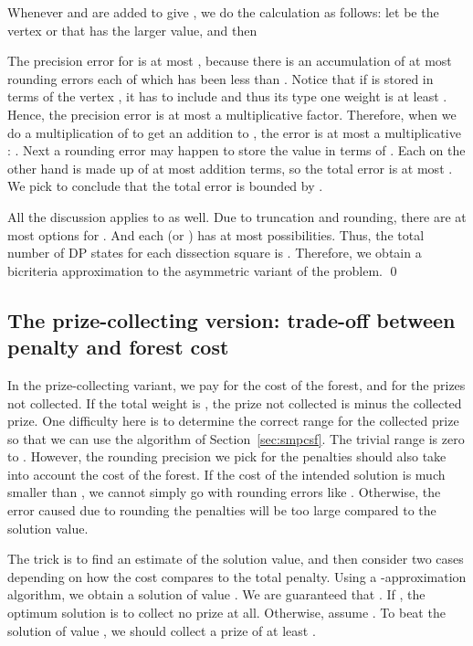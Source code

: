 \documentclass[extras,11pt]{article} \usepackage{fullpage}
\theoremstyle{mytheorem}
\newenvironment{proofof}[1]{\par\noindent{\bf #1.}\hspace{0.5em}}
    {\hfill\qed\vspace{1ex}}
\begin{document}
Whenever  and  are added to give
,  we do the calculation as follows:
let  be the vertex   or  that has the larger  value,
and then 




\begin{proofof}{\proofname\ of Theorem~\ref{thm:asym-smpcsf}}
The precision error for  is at most
, because there is an accumulation of at most 
rounding errors each of which has been less than .
Notice that if  is stored in terms of the vertex , it has to include  and
thus its type one weight is at least .  Hence, the precision error is at most a
 multiplicative factor.
Therefore, when we do a multiplication of  to get an addition to ,
the error is at most a multiplicative :
.
Next a rounding error may happen to store the value in terms of .
Each  on the other hand is made up of at most  addition terms,
so the total error is at most .
We pick  to conclude that the total error is bounded by
.

All the discussion applies to  as well.
Due to truncation and rounding, there are at most  options for .
And each  (or ) has at most  possibilities.
Thus, the total number of DP states for each dissection square is .
Therefore, we obtain a bicriteria approximation to the asymmetric variant of the problem.
\end{proofof}


\subsection{The prize-collecting version: trade-off between penalty and forest cost}\label{sec:prize-mpcsf}

In the prize-collecting variant, we pay for the cost of the forest,
and for the prizes not collected.
If the total weight is ,
the prize not collected is  minus the collected prize.
One difficulty here is to determine the correct range for the collected prize
so that we can use the algorithm of Section~\ref{sec:smpcsf}.
The trivial range is zero to .
However, the rounding precision we pick for the penalties should also take into
account the cost of the forest.  If the cost of the intended solution is much smaller than
, we cannot simply go with rounding errors like .
Otherwise, the error caused due to rounding the penalties will be too large compared to the solution value.

The trick is to find an estimate of the solution value, and then consider two cases depending on
how the cost compares to the total penalty.
Using a -approximation  algorithm, we obtain a solution of value .
We are guaranteed that .
If ,
 the optimum solution is to collect no prize at all.
Otherwise, assume .
To beat the solution of value , we should collect
a prize of at least .
\end{document}
